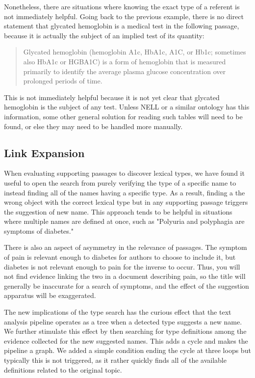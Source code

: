 \documentclass[12pt,letterpaper]{article}
\begin{document}
Nonetheless, there are situations where knowing the exact type of a referent is not immediately helpful. Going back to the previous example, there is no direct statement that glycated hemoglobin is a medical test in the following passage, because it is actually the subject of an implied test of its quantity:
\begin{quote}
Glycated hemoglobin (hemoglobin A1c, HbA1c, A1C, or Hb1c; sometimes also HbA1c or HGBA1C) is a form of hemoglobin that is measured primarily to identify the average plasma glucose concentration over prolonged periods of time.
\end{quote}
This is not immediately helpful because it is not yet clear that glycated hemoglobin is the subject of any test. Unless NELL or a similar ontology has this information, some other general solution for reading such tables will need to be found, or else they may need to be handled more manually.

\subsection{Link Expansion}
When evaluating supporting passages to discover lexical types, we have found it useful to open the search from purely verifying the type of a specific name to instead finding all of the names having a specific type. As a result, finding a the wrong object with the correct lexical type but in any supporting passage triggers the suggestion of new name. This approach tends to be helpful in situations where multiple names are defined at once, such as "Polyuria and polyphagia are symptoms of diabetes."

There is also an aspect of asymmetry in the relevance of passages. The symptom of pain is relevant enough to diabetes for authors to choose to include it, but diabetes is not relevant enough to pain for the inverse to occur. Thus, you will not find evidence linking the two in a document describing pain, so the title will generally be inaccurate for a search of symptoms, and the effect of the suggestion apparatus will be exaggerated.

The new implications of the type search has the curious effect that the text analysis pipeline operates as a tree when a detected type suggests a new name. We further stimulate this effect by then searching for type definitions among the evidence collected for the new suggested names. This adds a cycle and makes the pipeline a graph. We added a simple condition ending the cycle at three loops but typically this is not triggered, as it rather quickly finds all of the available definitions related to the original topic.
\end{document}

